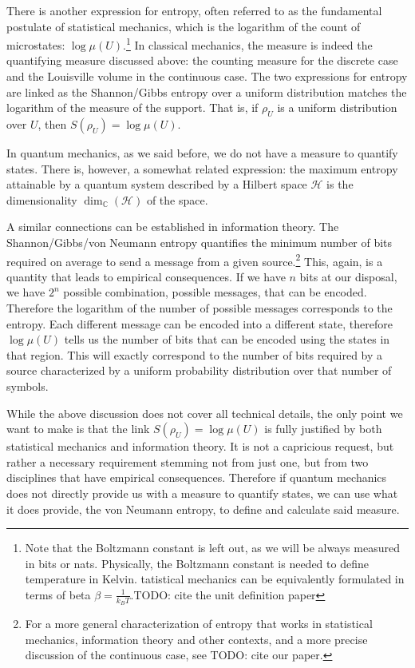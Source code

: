\documentclass[10pt,twocolumn, nofootinbib]{revtex4-2}
\begin{document}
There is another expression for entropy, often referred to as the fundamental postulate of statistical mechanics, which is the logarithm of the count of microstates: $\log \mu(U)$.\footnote{Note that the Boltzmann constant is left out, as we will be always measured in bits or nats. Physically, the Boltzmann constant is needed to define temperature in Kelvin. tatistical mechanics can be equivalently formulated in terms of beta $\beta = \frac{1}{k_B T}$.TODO: cite the unit definition paper} In classical mechanics, the measure is indeed the quantifying measure discussed above: the counting measure for the discrete case and the Louisville volume in the continuous case. The two expressions for entropy are linked as the Shannon/Gibbs entropy over a uniform distribution matches the logarithm of the measure of the support. That is, if $\rho_U$ is a uniform distribution over $U$, then $S(\rho_U) = \log \mu(U)$.

In quantum mechanics, as we said before, we do not have a measure to quantify states. There is, however, a somewhat related expression: the maximum entropy attainable by a quantum system described by a Hilbert space $\mathcal{H}$ is the dimensionality $\dim_{\mathbb{C}}(\mathcal{H})$ of the space.

A similar connections can be established in information theory. The Shannon/Gibbs/von Neumann entropy quantifies the minimum number of bits required on average to send a message from a given source.\footnote{For a more general characterization of entropy that works in statistical mechanics, information theory and other contexts, and a more precise discussion of the continuous case, see TODO: cite our paper.} This, again, is a quantity that leads to empirical consequences. If we have $n$ bits at our disposal, we have $2^n$ possible combination, possible messages, that can be encoded. Therefore the logarithm of the number of possible messages corresponds to the entropy. Each different message can be encoded into a different state, therefore $\log \mu(U)$ tells us the number of bits that can be encoded using the states in that region. This will exactly correspond to the number of bits required by a source characterized by a uniform probability distribution over that number of symbols.

While the above discussion does not cover all technical details, the only point we want to make is that the link $S(\rho_U) = \log \mu(U)$ is fully justified by both statistical mechanics and information theory. It is not a capricious request, but rather a necessary requirement stemming not from just one, but from two disciplines that have empirical consequences. Therefore if quantum mechanics does not directly provide us with a measure to quantify states, we can use what it does provide, the von Neumann entropy, to define and calculate said measure.
\end{document}
